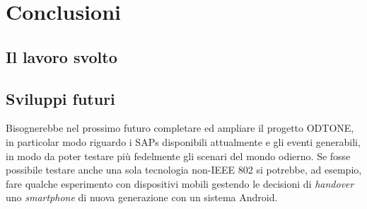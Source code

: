 \chapter{Conclusioni}

\section{Il lavoro svolto}


\section{Sviluppi futuri}
Bisognerebbe nel prossimo futuro completare ed ampliare il progetto ODTONE, in particolar modo riguardo i SAPs disponibili attualmente e gli eventi generabili, in modo da poter testare più fedelmente gli scenari del mondo odierno. Se fosse possibile testare anche una sola tecnologia non-IEEE 802 si potrebbe, ad esempio, fare qualche esperimento con dispositivi mobili gestendo le decisioni di {\em handover} uno {\em smartphone} di nuova generazione con un sistema Android.